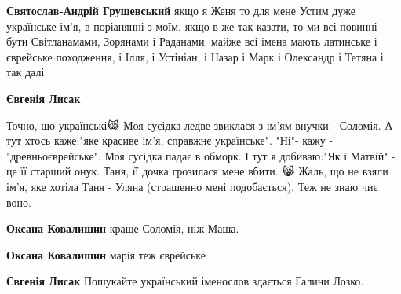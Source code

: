 \begin{itemize}
\begin{itemize}
\textbf{Святослав-Андрій Грушевський} якщо я Женя то для мене Устим дуже
українське ім'я, в поріанянні з моїм. якщо в же так казати, то ми всі повинні
бути Світланамами, Зорянами і Раданами. майже всі імена мають латинське і
єврейське походження, і Ілля, і Устініан, і Назар і Марк і Олександр і Тетяна і
так далі

 
\textbf{Євгенія Лисак} 

Точно, що українські😹 Моя сусідка ледве звиклася з ім'ям внучки - Соломія. А
тут хтось каже:"яке красиве ім'я, справжнє українське". "Ні"- кажу -
"древньоєврейське". Моя сусідка падає в обморк. І тут я добиваю:"Як і Матвій" -
це її старший онук. Таня, її дочка грозилася мене вбити. 😹 Жаль, що не взяли
ім'я, яке хотіла Таня - Уляна (страшенно мені подобається). Теж не знаю чиє
воно.


 
\textbf{Оксана Ковалишин} краще Соломія, ніж Маша.

 
\textbf{Оксана Ковалишин} марія теж єврейське

 
\textbf{Євгенія Лисак} Пошукайте український іменослов здається Галини Лозко.

 

\end{itemize}
\end{itemize}
